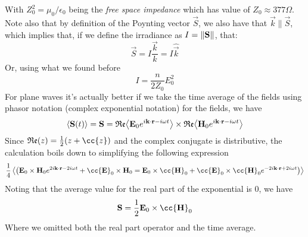 \documentclass[../electromagnetism.tex]{subfiles}
\begin{document}
With $Z_0^2=\mu_0/\epsilon_0$ being the \textit{free space impedance} which has value of $Z_0\approx377\Omega$.
Note also that by definition of the Poynting vector $\vec{S}$, we also have that $\vec{k}\parallel\vec{S}$, which implies that, if we define the irradiance as $I=\norm{\mathbf{S}}$, that:
\begin{equation}
	\vec{S}=I\frac{\vec{k}}{k}=I\hat{\vec{k}}
	\label{eq:irradiance.waves}
\end{equation}
Or, using what we found before
\begin{equation}
	I=\frac{n}{2Z_0}E_0^2
	\label{eq:irradiancevse.waves}
\end{equation}
For plane waves it's actually better if we take the time average of the fields using phasor notation (complex exponential notation) for the fields, we have
\begin{equation*}
	\expval{\mathbf{S}(t)}=\mathbf{S}=\mathfrak{Re}{\expval{\mathbf{E}_0e^{i\mathbf{k}\cdot\mathbf{r}-i\omega t}}}\times\mathfrak{Re}{\expval{\mathbf{H}_0e^{i\mathbf{k}\cdot\mathbf{r}-i\omega t}}}
\end{equation*}
Since $\real(z)=\frac{1}{2}(z+\cc{z})$ and the complex conjugate is distributive, the calculation boils down to simplifying the following expression
\begin{equation*}
	\frac{1}{4}\expval{\left( \vec{E}_0\times\vec{H}_0e^{2i\vec{k}\cdot\vec{r}-2i\omega t}+\cc{\vec{E}}_0\times\vec{H}_0=\vec{E}_0\times\cc{\vec{H}}_0+\cc{\vec{E}}_0\times\cc{\vec{H}}_0e^{-2i\vec{k}\cdot\vec{r}+2i\omega t}\right)}
\end{equation*}
Noting that the average value for the real part of the exponential is $0$, we have 
\begin{equation}
	\vec{S}=\frac{1}{2}\vec{E}_0\times\cc{\vec{H}}_0 
	\label{eq:averagepoynting.waves}
\end{equation}
Where we omitted both the real part operator and the time average.
\end{document}
